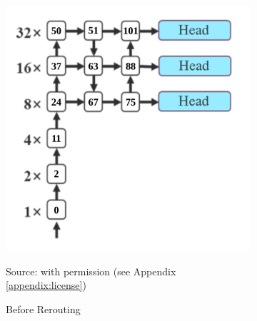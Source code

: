 \begin{figure}
    \centering
    \begin{subfigure}[][][b]{0.4\textwidth}
      \includegraphics[width=1\linewidth]{figures/deeperconn-before.png}
      \caption*{Source: \textcite{yolov7} with permission (see Appendix \ref{appendix:license})}
      \caption{Before Rerouting}
      \label{fig:deeperconn-before}
    \end{subfigure}\hfill%
    \begin{subfigure}[][][t]{0.4\textwidth}

\end{subfigure}
\end{figure}
